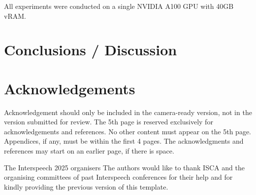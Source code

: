 \documentclass{Interspeech}
\begin{document}
All experiments were conducted on a single NVIDIA A100 GPU with 40GB vRAM.

\section{Conclusions / Discussion}\label{sec:conclusions}

\newpage
\ifinterspeechfinal
  \section{Acknowledgements}
  Acknowledgement should only be included in the camera-ready version, not in the
  version submitted for review. The 5th page is reserved exclusively for
  acknowledgements and references. No other content must appear on the 5th page.
  Appendices, if any, must be within the first 4 pages. The acknowledgments and
  references may start on an earlier page, if there is space.

  \ifinterspeechfinal
    The Interspeech 2025 organisers
  \else
    The authors
  \fi
  would like to thank ISCA and the organising committees of past Interspeech conferences for their help and for kindly providing the previous version of this template.
\fi



\end{document}
